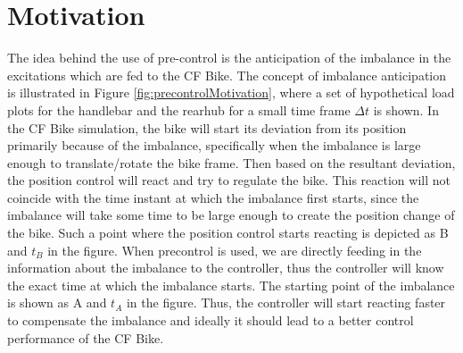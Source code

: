 \section{Motivation}
The idea behind the use of pre-control is the anticipation of the imbalance in the excitations which are fed to the CF Bike. The concept of imbalance anticipation is illustrated in Figure \ref{fig:precontrolMotivation}, where a set of hypothetical load plots for the handlebar and the rearhub for a small time frame $\Delta t$ is shown. In the CF Bike simulation, the bike will start its deviation from its position primarily because of the imbalance, specifically when the imbalance is large enough to translate/rotate the bike frame. Then based on the resultant deviation, the position control will react and try to regulate the bike. This reaction will not coincide with the time instant at which the imbalance first starts, since the imbalance will take some time to be large enough to create the position change of the bike. Such a point where the position control starts reacting is depicted as B and $t_B$ in the figure. When precontrol is used, we are directly feeding in the information about the imbalance to the controller, thus the controller will know the exact time at which the imbalance starts. The starting point of the imbalance is shown as A and $t_A$ in the figure. Thus, the controller will start reacting faster to compensate the imbalance and ideally it should lead to a better control performance of the CF Bike.

